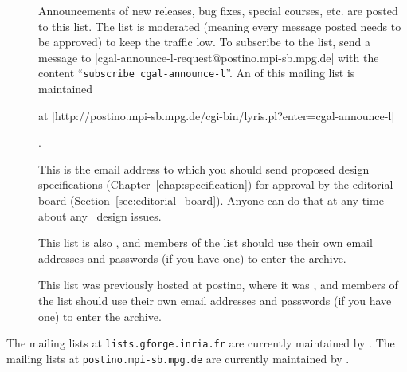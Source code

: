 \begin{description}
\item[] 
     Announcements of new releases, bug fixes, special courses, etc. are posted
     to this list.  The list is moderated (meaning every message posted needs
     to be approved) to keep the traffic low.
     To subscribe to the list, send a message to
     {\nonlinkedpath|cgal-announce-l-request@postino.mpi-sb.mpg.de|}
     with the content ``\texttt{subscribe cgal-announce-l}''.
     An  
     of this mailing list is maintained%
     \begin{ccTexOnly}
     at \nonlinkedpath|http://postino.mpi-sb.mpg.de/cgi-bin/lyris.pl?enter=cgal-announce-l|
     \end{ccTexOnly}.

\item[] 
     This is the email address to which you should
     send proposed design specifications (Chapter~\ref{chap:specification})
     for approval by the editorial 
     board (Section~\ref{sec:editorial_board}). Anyone can do that 
     at any time about any \cgal\ design issues. 

     This list is also
     , and members of the list should use their own
     email addresses and passwords (if you have one) to enter the archive.

     This list was previously hosted at postino, where it was
     , and members of the list should use their own
     email addresses and passwords (if you have one) to enter the archive.
\end{description}

The mailing lists at \texttt{lists.gforge.inria.fr} are currently maintained by
.
The mailing lists at \texttt{postino.mpi-sb.mpg.de} 
are currently
maintained by . 
